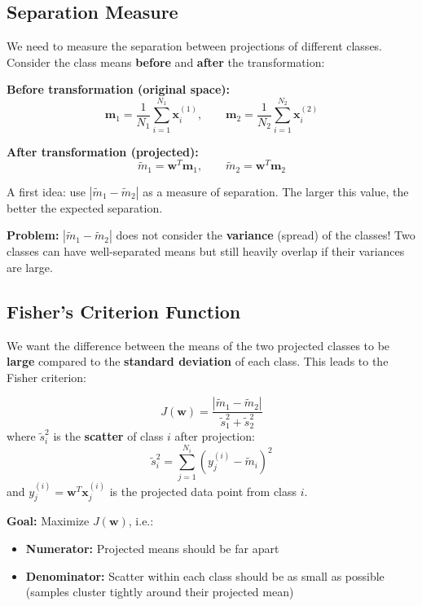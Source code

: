 \documentclass[11pt,a4paper]{article}
\theoremstyle{definition}
\theoremstyle{plain}
\theoremstyle{remark}
\begin{document}
\subsection{Separation Measure}

We need to measure the separation between projections of different classes. Consider the class means \textbf{before} and \textbf{after} the transformation:

\textbf{Before transformation (original space):}
\[
\mathbf{m}_1 = \frac{1}{N_1} \sum_{i=1}^{N_1} \mathbf{x}_i^{(1)}, \qquad \mathbf{m}_2 = \frac{1}{N_2} \sum_{i=1}^{N_2} \mathbf{x}_i^{(2)}
\]

\textbf{After transformation (projected):}
\[
\tilde{m}_1 = \mathbf{w}^T \mathbf{m}_1, \qquad \tilde{m}_2 = \mathbf{w}^T \mathbf{m}_2
\]

A first idea: use $|\tilde{m}_1 - \tilde{m}_2|$ as a measure of separation. The larger this value, the better the expected separation.

\textbf{Problem:} $|\tilde{m}_1 - \tilde{m}_2|$ does not consider the \textbf{variance} (spread) of the classes! Two classes can have well-separated means but still heavily overlap if their variances are large.

\subsection{Fisher's Criterion Function}

We want the difference between the means of the two projected classes to be \textbf{large} compared to the \textbf{standard deviation} of each class. This leads to the Fisher criterion:

\begin{tcolorbox}[colback=purple!5!white,colframe=purple!75!black,title=\textbf{Fisher's Criterion}]
\[
J(\mathbf{w}) = \frac{|\tilde{m}_1 - \tilde{m}_2|}{\tilde{s}_1^2 + \tilde{s}_2^2}
\]
where $\tilde{s}_i^2$ is the \textbf{scatter} of class $i$ after projection:
\[
\tilde{s}_i^2 = \sum_{j=1}^{N_i} \left( y_j^{(i)} - \tilde{m}_i \right)^2
\]
and $y_j^{(i)} = \mathbf{w}^T \mathbf{x}_j^{(i)}$ is the projected data point from class $i$.

\textbf{Goal:} Maximize $J(\mathbf{w})$, i.e.:
\begin{itemize}
    \item \textbf{Numerator:} Projected means should be far apart
    \item \textbf{Denominator:} Scatter within each class should be as small as possible (samples cluster tightly around their projected mean)
\end{itemize}
\end{tcolorbox}
\end{document}
